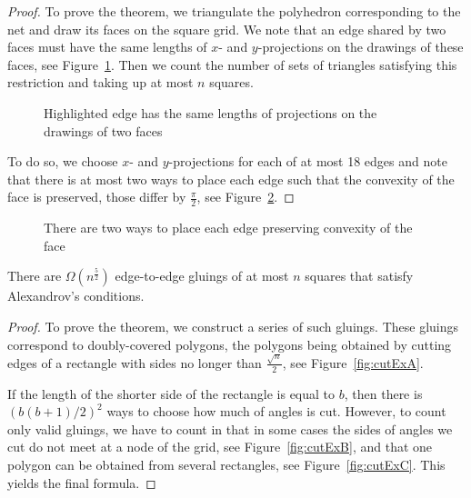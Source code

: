 \documentclass[a4paper,USenglish,cleveref, autoref, thm-restate]{socg-lipics-v2019}
\begin{document}
\begin{proof} To prove the theorem, we triangulate the polyhedron corresponding to the net and draw its faces on the square grid. We note that an edge shared by two faces must have the same lengths of $x$- and $y$-projections on the drawings of these faces, see Figure~\ref{fig:edgesMeeting}. Then we count the number of sets of triangles satisfying this restriction and taking up at most $n$ squares.

\begin{figure}[h] \centering
{}\hspace{1.2cm}
\caption{Highlighted edge has the same lengths of projections on the drawings of two faces}
\label{fig:edgesMeeting}
\end{figure}

To do so, we choose $x$- and $y$-projections for each of at most 18 edges and note that there is at most two ways to place each edge such that the convexity of the face is preserved, those differ by $\frac{\pi}{2}$, see Figure~\ref{fig:twoWays}. \end{proof}

\begin{figure}[h] \centering
{}
\caption{There are two ways to place each edge preserving convexity of the face}
\label{fig:twoWays}
\end{figure}

\begin{theorem} \label{thm:n52}
	There are $\Omega \left( n^{\frac52} \right)$ edge-to-edge gluings of at most $n$ squares that satisfy Alexandrov's conditions.
\end{theorem}

\begin{proof} To prove the theorem, we construct a series of such gluings. These gluings correspond to doubly-covered polygons, the polygons being obtained by cutting edges of a rectangle with sides no longer than $\frac{\sqrt{n}}{2}$, see Figure~\ref{fig:cutExA}.



If the length of the shorter side of the rectangle is equal to $b$, then there is $\left( b(b+1) / 2 \right)^2$ ways to choose how much of angles is cut. However, to count only valid gluings, we have to count in that in some cases the sides of angles we cut do not meet at a node of the grid, see Figure~\ref{fig:cutExB}, and that one polygon can be obtained from several rectangles, see Figure~\ref{fig:cutExC}. This yields the final formula.\end{proof}

% 
\end{document}
